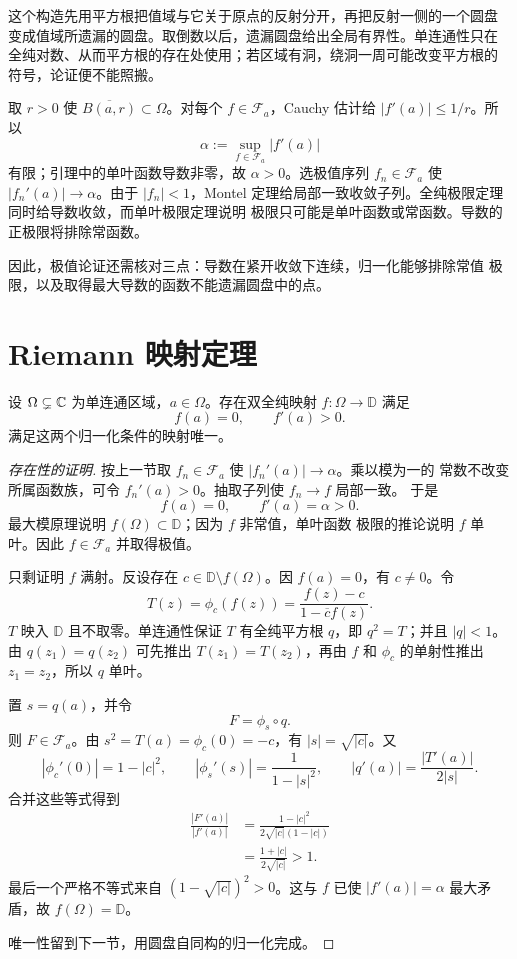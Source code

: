 这个构造先用平方根把值域与它关于原点的反射分开，再把反射一侧的一个圆盘
变成值域所遗漏的圆盘。取倒数以后，遗漏圆盘给出全局有界性。单连通性只在
全纯对数、从而平方根的存在处使用；若区域有洞，绕洞一周可能改变平方根的
符号，论证便不能照搬。

取 $r>0$ 使 $\overline{B(a,r)}\subset\Omega$。对每个 $f\in\mathcal F_a$，Cauchy
估计给 $|f'(a)|\le1/r$。所以
\[
 \alpha:=\sup_{f\in\mathcal F_a}|f'(a)|
\]
有限；引理中的单叶函数导数非零，故 $\alpha>0$。选极值序列
$f_n\in\mathcal F_a$ 使 $|f_n'(a)|\to\alpha$。由于 $|f_n|<1$，Montel
定理给局部一致收敛子列。全纯极限定理同时给导数收敛，而单叶极限定理说明
极限只可能是单叶函数或常函数。导数的正极限将排除常函数。

因此，极值论证还需核对三点：导数在紧开收敛下连续，归一化能够排除常值
极限，以及取得最大导数的函数不能遗漏圆盘中的点。

\section{Riemann 映射定理}

\begin{theorem}\label{thm:riemann-mapping}
设 $\Omega\subsetneq\mathbb{C}$ 为单连通区域，$a\in\Omega$。存在双全纯映射
$f:\Omega\to\mathbb D$ 满足
\[
 f(a)=0,\qquad f'(a)>0.
\]
满足这两个归一化条件的映射唯一。
\end{theorem}

\begin{proof}[存在性的证明]
按上一节取 $f_n\in\mathcal F_a$ 使 $|f_n'(a)|\to\alpha$。乘以模为一的
常数不改变所属函数族，可令 $f_n'(a)>0$。抽取子列使 $f_n\to f$ 局部一致。
于是
\[
 f(a)=0,\qquad f'(a)=\alpha>0.
\]
最大模原理说明 $f(\Omega)\subset\mathbb D$；因为 $f$ 非常值，单叶函数
极限的推论说明 $f$ 单叶。因此 $f\in\mathcal F_a$ 并取得极值。

只剩证明 $f$ 满射。反设存在 $c\in\mathbb D\setminus f(\Omega)$。因
$f(a)=0$，有 $c\ne0$。令
\[
 T(z)=\phi_c(f(z))=\frac{f(z)-c}{1-\overline c f(z)}.
\]
$T$ 映入 $\mathbb D$ 且不取零。单连通性保证 $T$ 有全纯平方根 $q$，即
$q^2=T$；并且 $|q|<1$。由 $q(z_1)=q(z_2)$ 可先推出
$T(z_1)=T(z_2)$，再由 $f$ 和 $\phi_c$ 的单射性推出 $z_1=z_2$，所以 $q$
单叶。

置 $s=q(a)$，并令
\[
 F=\phi_s\circ q.
\]
则 $F\in\mathcal F_a$。由 $s^2=T(a)=\phi_c(0)=-c$，有
$|s|=\sqrt{|c|}$。又
\[
 |\phi_c'(0)|=1-|c|^2,\qquad
 |\phi_s'(s)|=\frac1{1-|s|^2},\qquad
 |q'(a)|=\frac{|T'(a)|}{2|s|}.
\]
合并这些等式得到
\begin{align*}
 \frac{|F'(a)|}{|f'(a)|}
 &=\frac{1-|c|^2}{2\sqrt{|c|}(1-|c|)}\\
 &=\frac{1+|c|}{2\sqrt{|c|}}>1.
\end{align*}
最后一个严格不等式来自 $(1-\sqrt{|c|})^2>0$。这与 $f$ 已使
$|f'(a)|=\alpha$ 最大矛盾，故 $f(\Omega)=\mathbb D$。

唯一性留到下一节，用圆盘自同构的归一化完成。
\end{proof}

